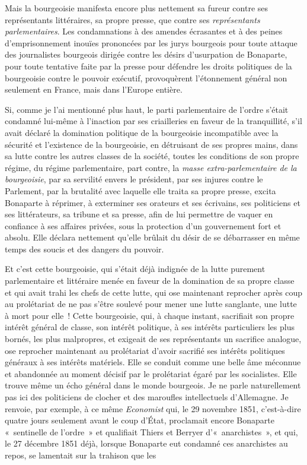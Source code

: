 \documentclass[french,twoside]{book} %
\begin{document}
Mais la bourgeoisie manifesta encore plus nettement sa fureur contre ses représentants littéraires, sa propre presse, que contre ses \emph{représentants parlementaires}. Les condamnations à des amendes écrasantes et à des peines d’emprisonnement inouïes prononcées par les jurys bourgeois pour toute attaque des journalistes bourgeois dirigée contre les désirs d’usurpation de Bonaparte, pour toute tentative faite par la presse pour défendre les droits politiques de la bourgeoisie contre le pouvoir exécutif, provoquèrent l’étonnement général non seulement en France, mais dans l’Europe entière.\par
Si, comme je l’ai mentionné plus haut, le parti parlementaire de l’ordre s’était condamné lui-même à l’inaction par ses criailleries en faveur de la tranquillité, s’il avait déclaré la domination politique de la bourgeoisie incompatible avec la sécurité et l’existence de la bourgeoisie, en détruisant de ses propres mains, dans sa lutte contre les autres classes de la société, toutes les conditions de son propre régime, du régime parlementaire, part contre, la \emph{masse extra-parlementaire de la bourgeoisie}, par sa servilité envers le président, par ses injures contre le Parlement, par la brutalité avec laquelle elle traita sa propre presse, excita Bonaparte à réprimer, à exterminer ses orateurs et ses écrivains, ses politiciens et ses littérateurs, sa tribune et sa presse, afin de lui permettre de vaquer en confiance à ses affaires privées, sous la protection d’un gouvernement fort et absolu. Elle déclara nettement qu’elle brûlait du désir de se débarrasser en même temps des soucis et des dangers du pouvoir.\par
Et c’est cette bourgeoisie, qui s’était déjà indignée de la lutte purement parlementaire et littéraire menée en faveur de la domination de sa propre classe et qui avait trahi les chefs de cette lutte, qui ose maintenant reprocher après coup au prolétariat de ne pas s’être soulevé pour mener une lutte sanglante, une lutte à mort pour elle ! Cette bourgeoisie, qui, à chaque instant, sacrifiait son propre intérêt général de classe, son intérêt politique, à ses intérêts particuliers les plus bornés, les plus malpropres, et exigeait de ses représentants un sacrifice analogue, ose reprocher maintenant au prolétariat d’avoir sacrifié ses intérêts politiques généraux à ses intérêts matériels. Elle se conduit comme une belle âme méconnue et abandonnée au moment décisif par le prolétariat égaré par les socialistes. Elle trouve même un écho général dans le monde bourgeois. Je ne parle naturellement pas ici des politiciens de clocher et des maroufles intellectuels d’Allemagne. Je renvoie, par exemple, à ce même \emph{Economist} qui, le 29 novembre 1851, c’est-à-dire quatre jours seulement avant le coup d’État, proclamait encore Bonaparte « sentinelle de l’ordre » et qualifiait Thiers et Berryer d’« anarchistes », et qui, le 27 décembre 1851 déjà, lorsque Bonaparte eut condamné ces anarchistes au repos, se lamentait sur la trahison que les\par
\end{document}
